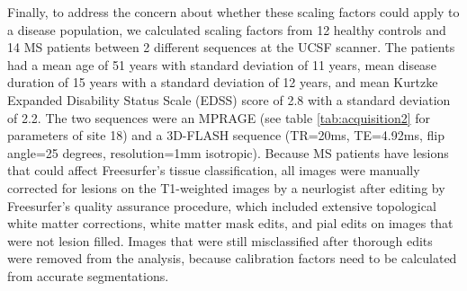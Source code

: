 Finally, to address the concern about whether these scaling factors could apply to a disease population, we calculated scaling factors from 12 healthy controls and 14 MS patients between 2 different sequences at the UCSF scanner. The patients had a mean age of 51 years with standard deviation of 11 years, mean disease duration of 15 years with a standard deviation of 12 years, and mean Kurtzke Expanded Disability Status Scale (EDSS) \cite{Kurtzke_1983} score of 2.8 with a standard deviation of 2.2. The two sequences were an MPRAGE (see table \ref{tab:acquisition2} for parameters of site 18) and a 3D-FLASH sequence (TR=20ms, TE=4.92ms, flip angle=25 degrees, resolution=1mm isotropic). Because MS patients have lesions that could affect Freesurfer's tissue classification, all images were manually corrected for lesions on the T1-weighted images by a neurlogist after editing by Freesurfer's quality assurance procedure, which included extensive topological white matter corrections, white matter mask edits, and pial edits on images that were not lesion filled. Images that were still misclassified after thorough edits were removed from the analysis, because calibration factors need to be calculated from accurate segmentations.